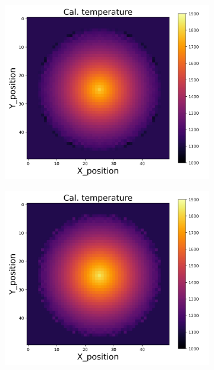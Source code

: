 {\begin{figure}[p]
\begin{minipage}{\textwidth}
\begin{subfigure}{0.325\textwidth}
        \end{subfigure}
    \end{minipage}\\
    \begin{minipage}{\textwidth}
        \centering
        \begin{subfigure}{0.325\textwidth}
            \centering
            \includegraphics[width=\textwidth]{figures/raw_data/22/exp/T_cal.jpg}
        \end{subfigure}
        \begin{subfigure}{0.325\textwidth}
            \centering
            \includegraphics[width=\textwidth]{figures/raw_data/23/exp/T_cal.jpg}

\end{subfigure}
\end{minipage}
\end{figure}}
